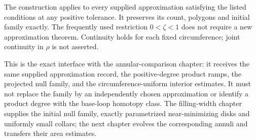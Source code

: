 The construction applies to every supplied approximation satisfying the
listed conditions at any positive tolerance.  It preserves its count,
polygons and initial family exactly.  The frequently used restriction
$0<\zeta<1$ does not require a new approximation theorem.
Continuity holds for each fixed circumference; joint continuity in $\rho$
is not asserted.

This is the exact interface with the annular-comparison chapter: it receives
the same supplied approximation record, the positive-degree product ramps,
the projected null family, and the circumference-uniform interior estimates.
It must not replace the family by an independently chosen approximation or
identify a product degree with the base-loop homotopy class.  The filling-width
chapter supplies the initial null family, exactly parametrized
near-minimizing disks and uniformly small collars; the next
chapter evolves the corresponding annuli and transfers their area estimates.

